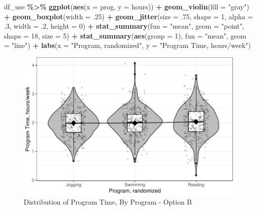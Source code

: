 \documentclass[
]{article}
\newenvironment{Shaded}{\begin{snugshade}}{\end{snugshade}}
\newcommand{\AttributeTok}[1]{\textcolor[rgb]{0.13,0.29,0.53}{#1}}
\newcommand{\DecValTok}[1]{\textcolor[rgb]{0.00,0.00,0.81}{#1}}
\newcommand{\FunctionTok}[1]{\textcolor[rgb]{0.13,0.29,0.53}{\textbf{#1}}}
\newcommand{\NormalTok}[1]{#1}
\newcommand{\SpecialCharTok}[1]{\textcolor[rgb]{0.81,0.36,0.00}{\textbf{#1}}}
\newcommand{\StringTok}[1]{\textcolor[rgb]{0.31,0.60,0.02}{#1}}
\begin{document}
\begin{Shaded}
\begin{Highlighting}[]
\NormalTok{df\_use }\SpecialCharTok{\%\textgreater{}\%} 
  \FunctionTok{ggplot}\NormalTok{(}\FunctionTok{aes}\NormalTok{(}\AttributeTok{x =}\NormalTok{ prog,}
             \AttributeTok{y =}\NormalTok{ hours)) }\SpecialCharTok{+} 
  \FunctionTok{geom\_violin}\NormalTok{(}\AttributeTok{fill =} \StringTok{"gray"}\NormalTok{) }\SpecialCharTok{+}
  \FunctionTok{geom\_boxplot}\NormalTok{(}\AttributeTok{width =}\NormalTok{ .}\DecValTok{25}\NormalTok{) }\SpecialCharTok{+}
  \FunctionTok{geom\_jitter}\NormalTok{(}\AttributeTok{size =}\NormalTok{ .}\DecValTok{75}\NormalTok{,}
              \AttributeTok{shape =} \DecValTok{1}\NormalTok{,}
              \AttributeTok{alpha =}\NormalTok{ .}\DecValTok{3}\NormalTok{,}
              \AttributeTok{width =}\NormalTok{ .}\DecValTok{2}\NormalTok{,}
              \AttributeTok{height =} \DecValTok{0}\NormalTok{) }\SpecialCharTok{+}
  \FunctionTok{stat\_summary}\NormalTok{(}\AttributeTok{fun =} \StringTok{"mean"}\NormalTok{,}
               \AttributeTok{geom =} \StringTok{"point"}\NormalTok{,}
               \AttributeTok{shape =} \DecValTok{18}\NormalTok{,}
               \AttributeTok{size =} \DecValTok{5}\NormalTok{) }\SpecialCharTok{+}
  \FunctionTok{stat\_summary}\NormalTok{(}\FunctionTok{aes}\NormalTok{(}\AttributeTok{group =} \DecValTok{1}\NormalTok{),}
               \AttributeTok{fun =} \StringTok{"mean"}\NormalTok{,}
               \AttributeTok{geom =} \StringTok{"line"}\NormalTok{) }\SpecialCharTok{+}
  \FunctionTok{labs}\NormalTok{(}\AttributeTok{x =} \StringTok{"Program, randomized"}\NormalTok{,}
       \AttributeTok{y =} \StringTok{"Program Time, hours/week"}\NormalTok{) }
\end{Highlighting}
\end{Shaded}

\begin{figure}[hb]

\includegraphics{Appendix_ex_weightloss_files/figure-latex/unnamed-chunk-43-1} \hfill{}

\caption{Distribution of Program Time, By Program - Option B}\label{fig:unnamed-chunk-43}
\end{figure}
\end{document}
